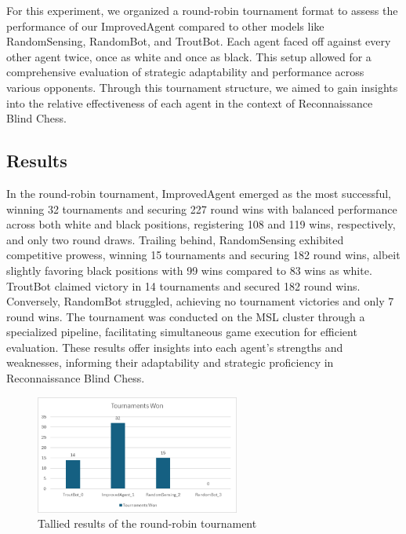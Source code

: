 \documentclass[10pt]{article}
\begin{document}
For this experiment, we organized a round-robin tournament format to assess the performance of our ImprovedAgent compared to other models like RandomSensing, RandomBot, and TroutBot. Each agent faced off against every other agent twice, once as white and once as black. This setup allowed for a comprehensive evaluation of strategic adaptability and performance across various opponents. Through this tournament structure, we aimed to gain insights into the relative effectiveness of each agent in the context of Reconnaissance Blind Chess.

\subsection{Results}

In the round-robin tournament, ImprovedAgent emerged as the most successful, winning 32 tournaments and securing 227 round wins with balanced performance across both white and black positions, registering 108 and 119 wins, respectively, and only two round draws. Trailing behind, RandomSensing exhibited competitive prowess, winning 15 tournaments and securing 182 round wins, albeit slightly favoring black positions with 99 wins compared to 83 wins as white. TroutBot claimed victory in 14 tournaments and secured 182 round wins. Conversely, RandomBot struggled, achieving no tournament victories and only 7 round wins. The tournament was conducted on the MSL cluster through a specialized pipeline, facilitating simultaneous game execution for efficient evaluation. These results offer insights into each agent's strengths and weaknesses, informing their adaptability and strategic proficiency in Reconnaissance Blind Chess.

\begin{figure}[H]
\centering
\includegraphics[width=0.6\textwidth]{tournamentTotal.png}
\caption{Tallied results of the round-robin tournament}
\label{fig:tournamentTotal}
\end{figure}
\end{document}
